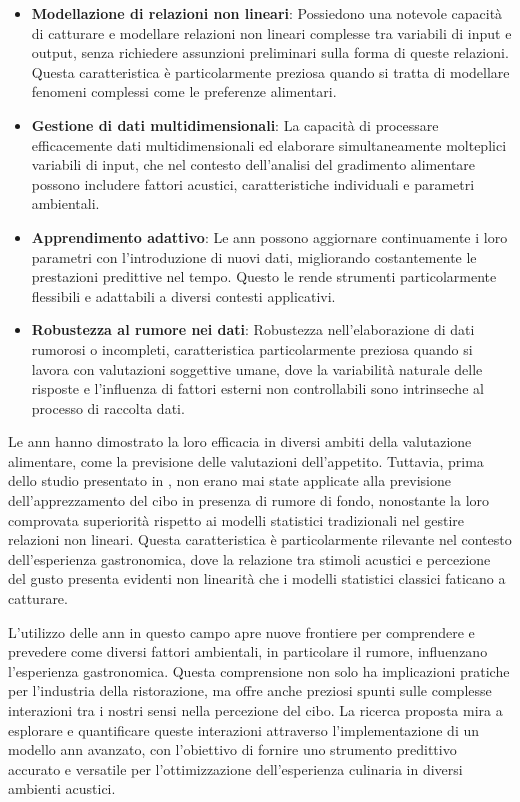 \begin{itemize}
    \item \textbf{Modellazione di relazioni non lineari}: Possiedono una notevole capacità di catturare e modellare relazioni non lineari complesse tra variabili di input e output, senza richiedere assunzioni preliminari sulla forma di queste relazioni. Questa caratteristica è particolarmente preziosa quando si tratta di modellare fenomeni complessi come le preferenze alimentari.
    \item \textbf{Gestione di dati multidimensionali}: La  capacità di processare efficacemente dati multidimensionali ed elaborare simultaneamente molteplici variabili di input, che nel contesto dell'analisi del gradimento alimentare possono includere fattori acustici, caratteristiche individuali e parametri ambientali.
    \item \textbf{Apprendimento adattivo}: Le \gls{ann} possono aggiornare continuamente i loro parametri con l'introduzione di nuovi dati, migliorando costantemente le prestazioni predittive nel tempo. Questo le rende strumenti particolarmente flessibili e adattabili a diversi contesti applicativi.
    \item \textbf{Robustezza al rumore nei dati}: Robustezza nell'elaborazione di dati rumorosi o incompleti, caratteristica particolarmente preziosa quando si lavora con valutazioni soggettive umane, dove la variabilità naturale delle risposte e l'influenza di fattori esterni non controllabili sono intrinseche al processo di raccolta dati.
\end{itemize}

Le \gls{ann} hanno dimostrato la loro efficacia in diversi ambiti della valutazione alimentare, come la previsione delle valutazioni dell'appetito. Tuttavia, prima dello studio presentato in \cite{alamir2021enhanced}, non erano mai state applicate alla previsione dell'apprezzamento del cibo in presenza di rumore di fondo, nonostante la loro comprovata superiorità rispetto ai modelli statistici tradizionali nel gestire relazioni non lineari. Questa caratteristica è particolarmente rilevante nel contesto dell'esperienza gastronomica, dove la relazione tra stimoli acustici e percezione del gusto presenta evidenti non linearità che i modelli statistici classici faticano a catturare.

L'utilizzo delle \gls{ann} in questo campo apre nuove frontiere per comprendere e prevedere come diversi fattori ambientali, in particolare il rumore, influenzano l'esperienza gastronomica. Questa comprensione non solo ha implicazioni pratiche per l'industria della ristorazione, ma offre anche preziosi spunti sulle complesse interazioni tra i nostri sensi nella percezione del cibo. La ricerca proposta mira a esplorare e quantificare queste interazioni attraverso l'implementazione di un modello \gls{ann} avanzato, con l'obiettivo di fornire uno strumento predittivo accurato e versatile per l'ottimizzazione dell'esperienza culinaria in diversi ambienti acustici.

